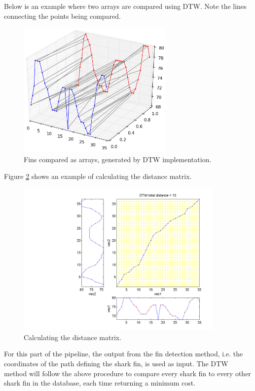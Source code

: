 \documentclass[a4paper,10pt]{article}
\begin{document}
Below is an example where two arrays are compared using DTW. Note the lines
connecting the points being compared.  

\begin{figure}[H]
 \centering
 \includegraphics[width=3in]{dtw.jpg}
 \caption{Fins compared as arrays, generated by DTW implementation.}
 \label{dtw}
\end{figure}

Figure \ref{dtw1} shows an example of calculating the distance matrix.

\begin{figure}[H]
 \centering
 \includegraphics[width=4in]{dtw1.png}
 \caption{Calculating the distance matrix\cite{dtw}.}
 \label{dtw1}
\end{figure}

For this part of the pipeline, the output from the fin detection method, i.e.
the coordinates of the path defining the shark fin, is used as input.  The DTW
method will follow the above procedure to compare every shark fin to every
other shark fin in the database, each time returning a minimum cost.  \\
\end{document}
